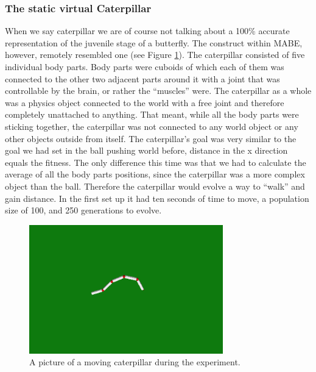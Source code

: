 \documentclass[12pt,oneside,listof=totoc,paper=a4,headings=small]{scrbook}
\begin{document}
\subsubsection{The static virtual Caterpillar}
When we say caterpillar we are of course not talking about a 100\% accurate representation of the juvenile stage of a butterfly. The construct within MABE, however, remotely resembled one (see Figure \ref{fig:Caterpillar}). The caterpillar consisted of five individual body parts. Body parts were cuboids of which each of them was connected to the other two adjacent parts around it with a joint that was controllable by the brain, or rather the ``muscles'' were. The caterpillar as a whole was a physics object connected to the world with a free joint and therefore completely unattached to anything. That meant, while all the body parts were sticking together, the caterpillar was not connected to any world object or any other objects outside from itself. The caterpillar's goal was very similar to the goal we had set in the ball pushing world before, distance in the x direction equals the fitness. The only difference this time was that we had to calculate the average of all the body parts positions, since the caterpillar was a more complex object than the ball. Therefore the caterpillar would evolve a way to ``walk'' and gain distance. In the first set up it had ten seconds of time to move, a population size of 100, and 250 generations to evolve.
\begin{figure}[h!]
\centering
\includegraphics[width=0.75\textwidth,height=0.75\textheight,keepaspectratio]{images/caterpillar.png}
\caption{A picture of a moving caterpillar during the experiment.}
\label{fig:Caterpillar}
\end{figure}

\newpage
\end{document}
